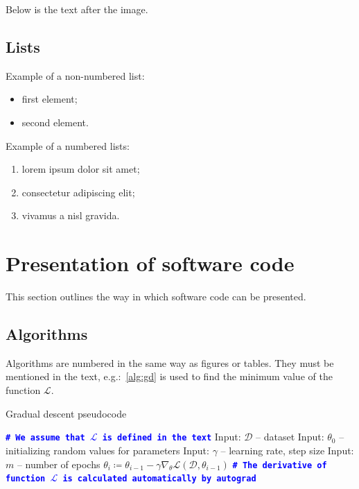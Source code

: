 \documentclass[]{VUMIFTemplateClass}
\begin{document}
Below is the text after the image.

\subsection{Lists}

Example of a non-numbered list:
\begin{itemize}
    \item first element;
    \item second element.
\end{itemize}

Example of a numbered lists:
\begin{enumerate}
    \item lorem ipsum dolor sit amet;
    \item consectetur adipiscing elit;
    \item vivamus a nisl gravida.
\end{enumerate}


\section{Presentation of software code}
This section outlines the way in which software code can be presented.

\subsection{Algorithms}

Algorithms are numbered in the same way as figures or tables. They must be mentioned in the text, e.g.:~\ref{alg:gd} is used to find the minimum value of the function $\mathcal{L}$.

\begin{algorithm}[h]
\caption{Gradual descent pseudocode}\label{alg:gd}
\begin{algorithmic}[1]
    \STATE \textcolor{blue}{\texttt{\textbf{\# We assume that $\mathcal{L}$ is defined in the text}}}
        \STATE Input: $\mathcal{D}$ -- dataset
        \STATE Input: $\theta_0$ -- initializing random values for parameters
        \STATE Input: $\gamma$ -- learning rate, step size
        \STATE Input: $m$ -- number of epochs
            \STATE $\theta_i \coloneq \theta_{i-1} - \gamma \nabla_\theta \mathcal{L}(\mathcal{D}, \theta_{i-1})$
            \STATE \textcolor{blue}{\texttt{\textbf{\# The derivative of function $\mathcal{L}$ is calculated automatically by autograd}}}
        \ENDFOR
\end{algorithmic}
\end{algorithm}
\end{document}
